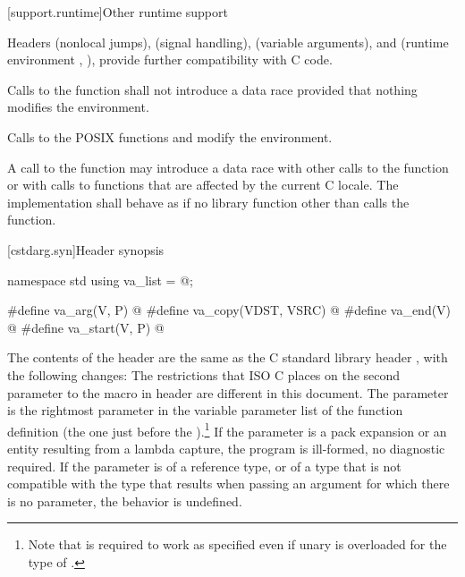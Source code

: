 [support.runtime]{Other runtime support}

\pnum
{}%
%
%
%
%
%
%
Headers
 (nonlocal jumps),
 (signal handling),
 (variable arguments),
and
 (runtime environment , ),
provide further compatibility with C code.

\pnum
Calls to the function
%
 shall not introduce a data
race provided that nothing modifies the environment.
\begin{note} Calls to the POSIX functions
%
 and
%
 modify the
environment. \end{note}

\pnum
A call to the  function
may introduce a data race with other
calls to the  function or with calls to functions that are
affected by the current C locale. The implementation shall behave as if no
library function other than  calls the 
function.

[cstdarg.syn]{Header  synopsis}

%
%
%
%
%
%
\begin{codeblock}
namespace std {
  using va_list = @\seebelow@;
}

#define va_arg(V, P) @\seebelow@
#define va_copy(VDST, VSRC) @\seebelow@
#define va_end(V) @\seebelow@
#define va_start(V, P) @\seebelow@
\end{codeblock}

\pnum
{}%
The contents of the header  are the same as the C
standard library header , with the following changes:
The restrictions that ISO C places on the second parameter to the
%
macro in header
%
are different in this document.
The parameter
is the rightmost parameter in the variable parameter list
of the function definition (the one just before the
).\footnote{Note that
is required to work as specified even if unary
is overloaded for the type of
.}
If the parameter  is a pack expansion or
an entity resulting from a lambda capture,
the program is ill-formed, no diagnostic required.
If the parameter
is of a reference type, or of a type that is not compatible with the
type that results when passing an argument for which there is no
parameter, the behavior is undefined.

